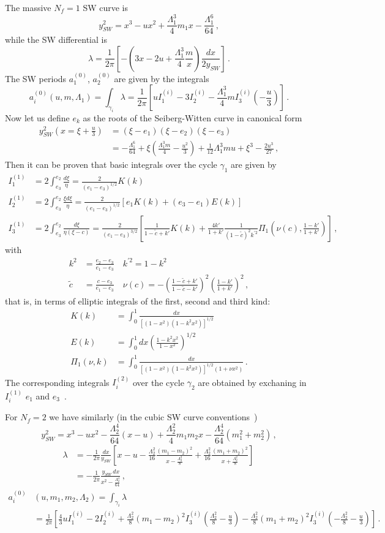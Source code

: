\documentclass[11pt,a4paper]{elsarticle}
\def \L {\Lambda}
\def \ba {\begin{aligned}}
\def \ea {\end{aligned}}
\newcommand{\be}{\begin{equation}}
\newcommand{\ee}{\end{equation}}
\def \L {\Lambda}
\numberwithin{figure}{section}
\numberwithin{table}{section}
\begin{document}
The massive $N_f=1$ SW curve is~\cite{BilalFerrari-massive:1997}
\be
y_{SW}^2=x^3-ux^2+\frac{\Lambda_1^3}{4} m_1 x - \frac{\Lambda_1^6}{64}\,,
\ee
while the SW differential is
\be 
\lambda =  \frac{1}{2\pi} \left[-\left(3x-2u + \frac{\Lambda_1^3}{4} \frac{m}{x} \right) \frac{d x}{2 y_{SW}} \right]\,.
\ee 
The SW periods $a^{(0)}_1$, $a^{(0)}_2$ are given by the integrals
\be  \label{perEllipticNf1}
a_i^{(0)}(u,m,\Lambda_1)=\int_{\gamma_i} \lambda = \frac{1}{2 \pi} \left[ u I_1^{(i)} - 3I_2^{(i)} - \frac{\Lambda_1^3}{4} m I_3^{(i)} \left(-\frac{u}{3} \right) \right]\,.
\ee 
Now let us define $e_k$ as the roots of the Seiberg-Witten curve in canonical form
\be 
\ba
y_{SW}^2(x=\xi + \frac{u}{3})&=(\xi - e_1) (\xi - e_2) (\xi - e_3)\\
&=-\frac{\Lambda_1 ^6}{64}+\xi  \left(\frac{\Lambda_1 ^3 m}{4}-\frac{u^2}{3}\right)+\frac{1}{12} \Lambda_1 ^3 m u+\xi ^3-\frac{2 u^3}{27}\,,
\ea 
\ee
Then it can be proven that basic integrals over the cycle $\gamma_1$ are given by
\be 
\ba 
I_1^{(1)} &= 2 \int_{e_3}^{e_2} \frac{d \xi}{\eta} = \frac{2}{(e_1-e_3)^{1/2}}K(k) \\
I_2^{(1)} &= 2 \int_{e_3}^{e_2} \frac{\xi d \xi}{\eta} = \frac{2}{(e_1-e_3)^{1/2}}[e_1 K(k)+(e_3-e_1) E(k)]\\
I_3^{(1)} &= 2 \int_{e_3}^{e_2} \frac{d \xi}{\eta(\xi-c)} = \frac{2}{(e_1-e_3)^{3/2}}\left[\frac{1}{1-\tilde{c}+k'}K(k) +\frac{4 k'}{1+k'} \frac{1}{(1-\tilde{c})^2k^{'2}} \Pi_1\left(\nu(c), \frac{1-k'}{1+k'}\right) \right]\,,
\ea 
\ee
with
\be 
\ba
k^2&= \frac{e_2-e_3}{e_1-e_3} \quad k^{'2} = 1- k^2 \\
\tilde{c} &= \frac{c-e_3}{e_1-e_3} \quad \nu(c) = - \left( \frac{1-\tilde{c}+k'}{1-\tilde{c}-k'} \right)^2 \left( \frac{1-k'}{1+k'}\right)^2\,,
\ea
\ee 
that is, in terms of elliptic integrals of the first, second and third kind:
\be 
\ba 
K(k) &= \int_0^1 \frac{dx}{[(1-x^2)(1-k^2 x^2)]^{1/2}} \\
E(k) &= \int_0^1 dx\left(\frac{1-k^2 x^2}{1-x^2}\right)^{1/2} \\
\Pi_1(\nu,k) &= \int_0^1 \frac{dx}{[(1-x^2)(1-k^2 x^2)]^{1/2}(1+\nu x^2)}\,.
\ea 
\ee 
The corresponding integrals $I_i^{(2)}$ over the cycle $\gamma_2$ are obtained by exchaning in $I_i^{(1)}$ $e_1$ and $e_3$~\cite{BilalFerrari-massive:1997}.




For $N_f=2$ we have similarly (in the cubic SW curve conventions~\cite{BilalFerrari-massive:1997})
\be 
y_{SW}^2= x^3- u x^2  - \frac{\L_2^4}{64}(x-u) + \frac{\L_2^2}{4} m_1 m_2 x - \frac{\L_2^4}{64} (m_1^2+m_2^2)\,,
\ee 
\be 
\ba
\lambda &= - \frac{1}{2 \pi} \frac{d x}{y_{SW}} \left[ x-u - \frac{\L_2^2}{16}\frac{(m_1-m_2)^2}{x-\frac{\L_2^2}{8}}+\frac{\L_2^2}{16}\frac{(m_1+m_2)^2}{x+\frac{\L_2^2}{8}} \right]\,\\
&= - \frac{1}{2\pi} \frac{y_{SW}\, d x}{x^2- \frac{\Lambda_2^4}{64}}\,,
\ea
\ee 
\be \label{perEllipticNf2}
\ba
a_i^{(0)}&(u,m_1,m_2,\Lambda_2)=\int_{\gamma_i} \lambda \\&= \frac{1}{2 \pi} \left[ \frac{4}{3} u I_1^{(i)} - 2 I_2^{(i)} + \frac{\L_2^2}{8} (m_1-m_2)^2 I_3^{(i)}\left(\frac{\L_2^2}{8} -\frac{u}{3} \right) -\frac{\L_2^2}{8} (m_1+m_2)^2 I_3^{(i)}\left(-\frac{\L_2^2}{8} -\frac{u}{3} \right) \right] \,.
\ea
\ee 
\end{document}
